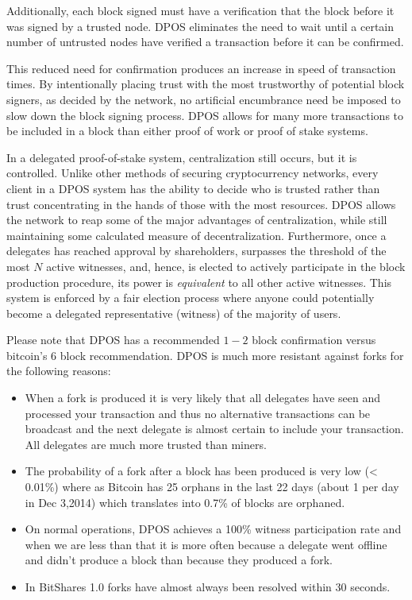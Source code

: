 Additionally, each block signed must have a verification that the block
before it was signed by a trusted node. DPOS eliminates the need to wait until
a certain number of untrusted nodes have verified a transaction before it can
be confirmed.

This reduced need for confirmation produces an increase in speed of transaction
times. By intentionally placing trust with the most trustworthy of potential
block signers, as decided by the network, no artificial encumbrance need be
imposed to slow down the block signing process. DPOS allows for many more
transactions to be included in a block than either proof of work or proof of
stake systems.

In a delegated proof-of-stake system, centralization still occurs, but it is
controlled. Unlike other methods of securing cryptocurrency networks, every
client in a DPOS system has the ability to decide who is trusted rather than
trust concentrating in the hands of those with the most resources. DPOS allows
the network to reap some of the major advantages of centralization, while still
maintaining some calculated measure of decentralization. Furthermore, once a
delegates has reached approval by shareholders, surpasses the threshold of the
most $N$ active witnesses, and, hence, is elected to actively participate in
the block production procedure, its power is \emph{equivalent} to all other
active witnesses. This system is enforced by a fair election process where
anyone could potentially become a delegated representative (witness) of the
majority of users.

Please note that DPOS has a recommended $1-2$ block confirmation versus
bitcoin's 6 block recommendation. DPOS is much more resistant against forks for
the following reasons:
\begin{itemize}
\item When a fork is produced it is
      very likely that all delegates have seen and processed your transaction and
      thus no alternative transactions can be broadcast and the next delegate is
      almost certain to include your transaction.  All delegates are much more
      trusted than miners.
\item The probability of a fork after a block has been produced is very low (<
      0.01\%) where as Bitcoin has 25 orphans in the last 22 days (about 1 per day in
      Dec 3,2014) which translates into 0.7\% of blocks are orphaned.
\item On normal operations, DPOS achieves a 100\% witness participation rate and when
      we are less than that it is more often because a delegate went offline and didn't
      produce a block than because they produced a fork. 
\item In BitShares 1.0 forks have almost always been resolved within 30 seconds. 
\end{itemize}

